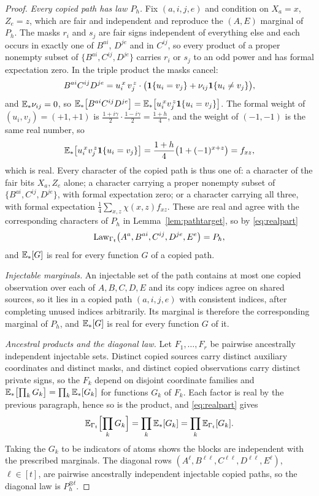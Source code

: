\begin{proof}
\emph{Every copied path has law $P_h$.} Fix $(a,i,j,e)$ and condition on $X_a=x$, $Z_e=z$, which are fair and independent and reproduce the $(A,E)$ marginal of $P_h$. The masks $r_i$ and $s_j$ are fair signs independent of everything else and each occurs in exactly one of $B^{ai}$, $D^{je}$ and in $C^{ij}$, so every product of a proper nonempty subset of $\{B^{ai},C^{ij},D^{je}\}$ carries $r_i$ or $s_j$ to an odd power and has formal expectation zero. In the triple product the masks cancel:
\[
B^{ai}C^{ij}D^{je}=u_i^{\,x}\,v_j^{\,z}\cdot\bigl(\mathbf 1\{u_i=v_j\}+\nu_{ij}\mathbf 1\{u_i\ne v_j\}\bigr),
\]
and $\mathbb E_\ast\nu_{ij}=0$, so $\mathbb E_\ast\bigl[B^{ai}C^{ij}D^{je}\bigr]=\mathbb E_\ast\bigl[u_i^{\,x}v_j^{\,z}\mathbf 1\{u_i=v_j\}\bigr]$. The formal weight of $(u_i,v_j)=(+1,+1)$ is $\frac{1+i\gamma}2\cdot\frac{1-i\gamma}2=\frac{1+h}4$, and the weight of $(-1,-1)$ is the same real number, so
\[
\mathbb E_\ast\bigl[u_i^{\,x}v_j^{\,z}\mathbf 1\{u_i=v_j\}\bigr]=\frac{1+h}4\bigl(1+(-1)^{x+z}\bigr)=f_{xz},
\]
which is real. Every character of the copied path is thus one of: a character of the fair bits $X_a,Z_e$ alone; a character carrying a proper nonempty subset of $\{B^{ai},C^{ij},D^{je}\}$, with formal expectation zero; or a character carrying all three, with formal expectation $\frac14\sum_{x,z}\chi(x,z)f_{xz}$. These are real and agree with the corresponding characters of $P_h$ in Lemma~\ref{lem:pathtarget}, so by \eqref{eq:realpart}
\[
\operatorname{Law}_{\Gamma_t}\bigl(A^a,B^{ai},C^{ij},D^{je},E^e\bigr)=P_h,
\]
and $\mathbb E_\ast[G]$ is real for every function $G$ of a copied path.

\emph{Injectable marginals.} An injectable set of the path contains at most one copied observation over each of $A,B,C,D,E$ and its copy indices agree on shared sources, so it lies in a copied path $(a,i,j,e)$ with consistent indices, after completing unused indices arbitrarily. Its marginal is therefore the corresponding marginal of $P_h$, and $\mathbb E_\ast[G]$ is real for every function $G$ of it.

\emph{Ancestral products and the diagonal law.} Let $F_1,\dots,F_r$ be pairwise ancestrally independent injectable sets. Distinct copied sources carry distinct auxiliary coordinates and distinct masks, and distinct copied observations carry distinct private signs, so the $F_k$ depend on disjoint coordinate families and $\mathbb E_\ast\bigl[\prod_k G_k\bigr]=\prod_k\mathbb E_\ast[G_k]$ for functions $G_k$ of $F_k$. Each factor is real by the previous paragraph, hence so is the product, and \eqref{eq:realpart} gives
\[
\mathbb E_{\Gamma_t}\Bigl[\prod_kG_k\Bigr]=\prod_k\mathbb E_\ast[G_k]=\prod_k\mathbb E_{\Gamma_t}[G_k].
\]
Taking the $G_k$ to be indicators of atoms shows the blocks are independent with the prescribed marginals. The diagonal rows $(A^\ell,B^{\ell\ell},C^{\ell\ell},D^{\ell\ell},E^\ell)$, $\ell\in[t]$, are pairwise ancestrally independent injectable copied paths, so the diagonal law is $P_h^{\otimes t}$.


\end{proof}
